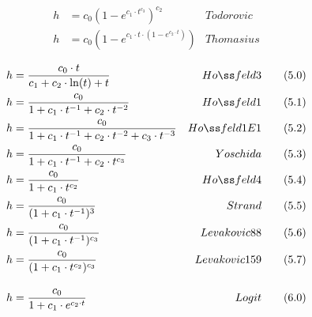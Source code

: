 \documentclass[a4paper,twocolumn]{article}
\begin{document}
\begin{table*}
\begin{minipage}[t]{.5\textwidth}
\begin{align*}
  \label{eq:todorovic}
  h & = c_0 (1 - e^{c_1 \cdot t^{c_3}} )^{c_2} & Todorovic \tag{4.8}\\
  \label{eq:thomasius}
  h & = c_0 (1 - e^{c_1 \cdot t \cdot (1 - e ^{c_2 \cdot t})}) &
  Thomasius \tag{4.9}%
\end{align*}
\end{minipage}%
\begin{minipage}[t]{.5\textwidth}
\begin{align*}
  \label{eq:hossfeld3}
  h & = \frac{c_0 \cdot t}{c_1 + c_2 \cdot \ln(t) + t} & Ho{\ss}feld 3 \tag{5.0}\\
  \label{eq:hossfeld1}
  h & = \frac{c_0}{1+c_1 \cdot t^{-1} + c_2 \cdot t^{-2}} & Ho{\ss}feld 1 \tag{5.1}\\
  \label{eq:hossfeld1E1}
  h & = \frac{c_0}{1+c_1 \cdot t^{-1} + c_2 \cdot t^{-2} + c_3 \cdot t^{-3}} & Ho{\ss}feld 1E1 \tag{5.2}\\
  \label{eq:yoschida}
  h & = \frac{c_0}{1+c_1 \cdot t^{-1} + c_2 \cdot t^{c_3}} & Yoschida \tag{5.3}\\
  \label{eq:hossfeld4}
  h & = \frac{c_0}{1 + c_1 \cdot t^{c_2}} & Ho{\ss}feld4 \tag{5.4}\\
  \label{eq:strand}
  h & = \frac{c_0}{(1 + c_1 \cdot t^{-1})^{3}} & Strand \tag{5.5}\\
  \label{eq:levakovic1}
  h & = \frac{c_0}{(1 + c_1 \cdot t^{-1})^{c_3}} & Levakovic88 \tag{5.6}\\
  \label{eq:levakovic2}
  h & = \frac{c_0}{(1 + c_1 \cdot t^{c_2})^{c_3}} &
  Levakovic159 \tag{5.7}\\[1em]
  \label{eq:logit}
  h &= \frac{c_0}{1+c_1 \cdot e^{c_2 \cdot t}} & Logit \tag{6.0}\\

\end{align*}
\end{minipage}
\end{table*}
\end{document}
